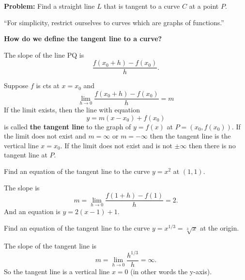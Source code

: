\documentclass[calc1-main.tex]{subfiles}
\begin{document}
  \textbf{Problem:} Find a straight line $L$ that is tangent to a curve $C$ at a point $P$.

  \textsf{``For simplicity, restrict ourselves to curves which are graphs of functions.''}

  \textbf{How do we define the tangent line to a curve?}
  \begin{figure}[H]
    \centering
    
  \end{figure}

  The slope of the line PQ is
  \[
    \dfrac{f(x_0 + h) - f(x_0)}{h}.
  \]

  \begin{definition}
    Suppose $f$ is cts at $x=x_0$ and
    \[
      \lim_{h \to 0} \dfrac{f(x_0 + h) - f(x_0)}{h} = m
    \]
    If the limit exists, then the line with equation
    \[
      y = m(x - x_0) + f(x_0)
    \]
    is called \textbf{the tangent line} to the graph of $y=f(x)$ at $P = (x_0, f(x_0))$.
    If the limit does not exist and $m = \infty$ or $m = -\infty$ then the tangent line is the vertical line $x=x_0$.
    If the limit does not exist and is not $\pm \infty$ then there is no tangent line at $P$.
  \end{definition}

  \begin{example}
    Find an equation of the tangent line to the curve $y = x^2$ at $(1, 1)$.
  \end{example}
  \begin{solution}
    The slope is
    \[
      m = \lim_{h \to 0} \dfrac{f(1+h)-f(1)}{h} = 2.
    \]
    And an equation is $y=2(x-1)+1$.
  \end{solution}
  \begin{example}
    Find an equation of the tangent line to the curve $y = x^{1/3} = \sqrt[3]{x}$ at the origin.
  \end{example}
  \begin{solution}
    The slope of the tangent line is
    \[
      m = \lim_{h \to 0} \dfrac{h^{1/3}}{h} = \infty.
    \]
    So the tangent line is a vertical line $x=0$ (in other words the y-axis).
    \begin{figure}[H]
      \centering
      
    \end{figure}
  \end{solution}
\end{document}
